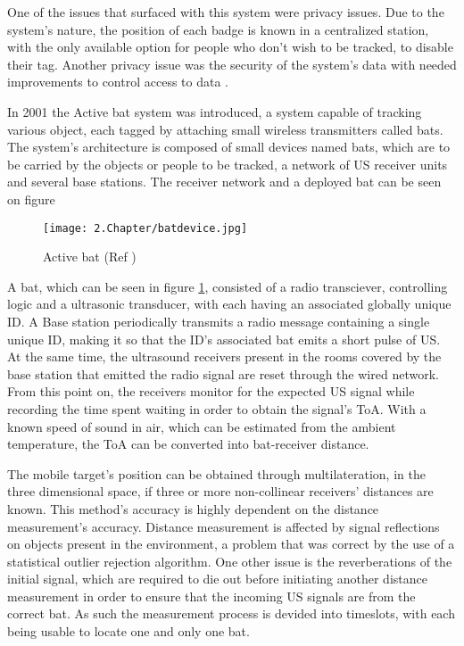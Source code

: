 One of the issues that surfaced with this system were privacy issues. Due to the system's nature, the position of each badge is known in a centralized station, with the only available option for people who don't wish to be tracked, to disable their tag. Another privacy issue was the security of the system's data with needed improvements to control access to data \cite{badge1}.


\label{subsec:bat}


In 2001 the Active bat system \cite{bat}was introduced, a system capable of tracking various object, each tagged by attaching small wireless transmitters called bats. The system's architecture is composed of small devices named bats, which are to be carried by the objects or people to be tracked, a network of \acf{US} receiver units and several base stations. The receiver network and a deployed bat can be seen on figure 

\begin{figure}[H]
	\centering
		\texttt{[image: 2.Chapter/batdevice.jpg]}
	\caption[Active bat (Ref \cite{batfig}) ]{Active bat (Ref \cite{batfig}) }
	\label{fig:bat}
\end{figure}

 A bat, which can be seen in figure \ref{fig:bat}, consisted of a radio transciever, controlling logic and a ultrasonic transducer, with each having an associated globally unique ID. A Base station periodically transmits a radio message containing a single unique ID, making it so that the ID's associated bat emits a short pulse of \ac{US}. At the same time, the ultrasound receivers present in the rooms covered by the base station that emitted the radio signal are reset through the wired network. From this point on, the receivers monitor for the expected \ac{US} signal while recording the time spent waiting in order to obtain the signal's \ac{ToA}. With a known speed of sound in air, which can be estimated from the ambient temperature, the \ac{ToA} can be converted into bat-receiver distance.

 The mobile target's position can be obtained through multilateration, in the three dimensional space, if three or more non-collinear receivers' distances are known. This method's accuracy is highly dependent on the distance measurement's accuracy. Distance measurement is affected by signal reflections on objects present in the environment, a problem that was correct by the use of a statistical outlier rejection algorithm. One other issue is the reverberations of the initial signal, which are required to die out before initiating another distance measurement in order to ensure that the incoming \ac{US} signals are from the correct bat. As such the measurement process is devided into timeslots, with each being usable to locate one and only one bat.

